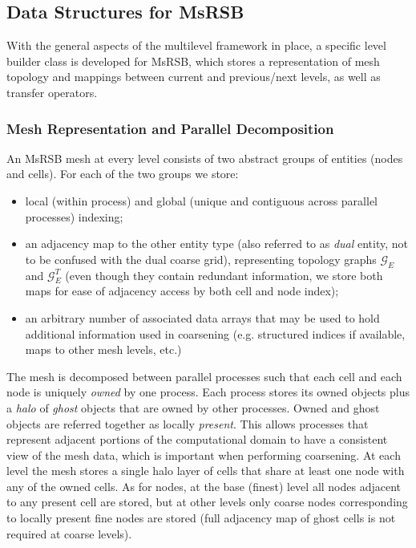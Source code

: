 \subsection{Data Structures for MsRSB}
\label{subsec:par_impl_data_struct}

With the general aspects of the multilevel framework in place, a specific level builder class is developed for MsRSB, which stores a representation of mesh topology and mappings between current and previous/next levels, as well as transfer operators.

\subsubsection{Mesh Representation and Parallel Decomposition}

An MsRSB mesh at every level consists of two abstract groups of entities (nodes and cells).   For each of the two groups we store:
\begin{itemize}
    \item local (within process) and global (unique and contiguous across parallel processes) indexing;
    \item an adjacency map to the other entity type (also referred to as \textit{dual} entity, not to be confused with the dual coarse grid), representing topology graphs $\mathcal{G}_E$ and $\mathcal{G}_E^T$ (even though they contain redundant information, we store both maps for ease of adjacency access by both cell and node index);
    \item an arbitrary number of associated data arrays that may be used to hold additional information used in coarsening (e.g. structured indices if available, maps to other mesh levels, etc.)
\end{itemize}

The mesh is decomposed between parallel processes such that each cell and each node is uniquely \textit{owned} by one process.   Each process stores its owned objects plus a \textit{halo} of \textit{ghost} objects that are owned by other processes.   Owned and ghost objects are referred together as locally \textit{present}.   This allows processes that represent adjacent portions of the computational domain to have a consistent view of the mesh data, which is important when performing coarsening.   At each level the mesh stores a single halo layer of cells that share at least one node with any of the owned cells.   As for nodes, at the base (finest) level all nodes adjacent to any present cell are stored, but at other levels only coarse nodes corresponding to locally present fine nodes are stored (full adjacency map of ghost cells is not required at coarse levels).

